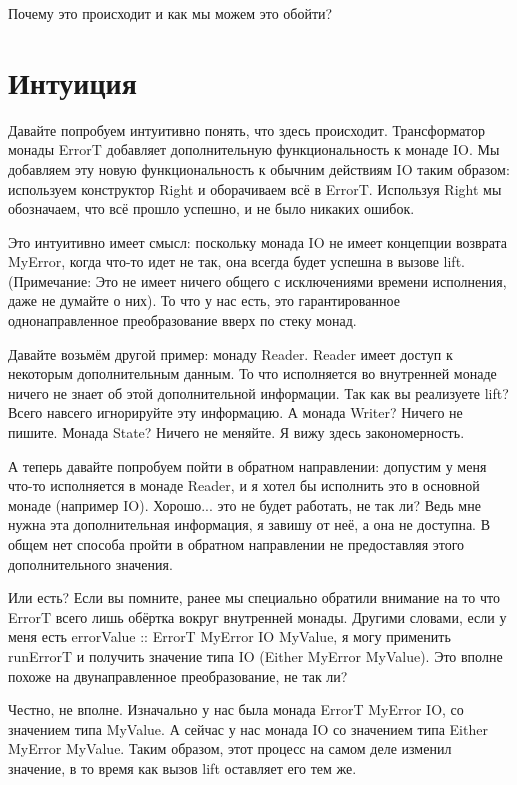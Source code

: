 Почему это происходит и как мы можем это обойти?

\section{Интуиция}

Давайте попробуем интуитивно понять, что здесь происходит. Трансформатор монады ErrorT добавляет дополнительную функциональность к монаде IO. Мы добавляем эту новую функциональность к обычним действиям IO таким образом: используем конструктор Right и оборачиваем всё в ErrorT. Используя Right мы обозначаем, что всё прошло успешно, и не было никаких ошибок.

Это интуитивно имеет смысл: поскольку монада IO не имеет концепции возврата MyError, когда что-то идет не так, она всегда будет успешна в вызове lift. (Примечание: Это не имеет ничего общего с исключениями времени исполнения, даже не думайте о них). То что у нас есть, это гарантированное однонаправленное преобразование вверх по стеку монад.

Давайте возьмём другой пример: монаду Reader. Reader имеет доступ к некоторым дополнительным данным. То что исполняется во внутренней монаде ничего не знает об этой дополнительной информации. Так как вы реализуете lift? Всего навсего игнорируйте эту информацию. А монада Writer? Ничего не пишите. Монада State? Ничего не меняйте. Я вижу здесь закономерность. 

А теперь давайте попробуем пойти в обратном направлении: допустим у меня что-то исполняется в монаде Reader, и я хотел бы исполнить это в основной монаде (например IO). Хорошо... это не будет работать, не так ли? Ведь мне нужна эта дополнительная информация, я завишу от неё, а она не доступна. В общем нет способа пройти в обратном направлении не предоставляя этого дополнительного значения.

Или есть? Если вы помните, ранее мы специально обратили внимание на то что ErrorT всего лишь обёртка вокруг внутренней монады. Другими словами, если у меня есть errorValue :: ErrorT MyError IO MyValue, я могу применить runErrorT и получить значение типа IO (Either MyError MyValue). Это вполне похоже на двунаправленное преобразование, не так ли?

Честно, не вполне. Изначально у нас была монада ErrorT MyError IO, со значением типа MyValue. А сейчас у нас монада IO со значением типа Either MyError MyValue. Таким образом, этот процесс на самом деле изменил значение, в то время как вызов lift оставляет его тем же.

